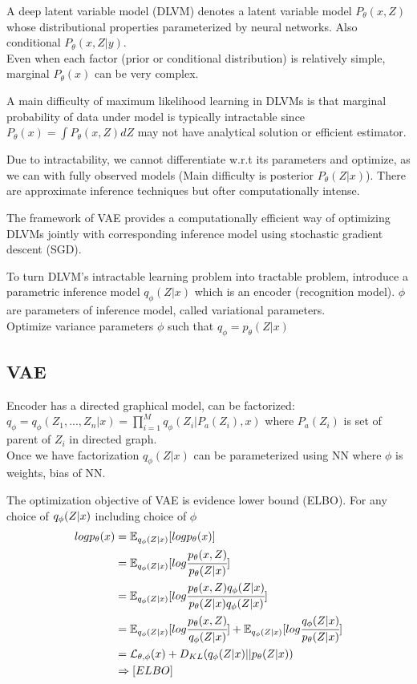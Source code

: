 \documentclass[12pt,a4paper]{article}
\begin{document}
A deep latent variable model (DLVM) denotes a latent variable model $P_\theta(x,Z)$ whose distributional properties parameterized by neural networks. Also conditional $P_\theta(x,Z|y)$. \\
Even when each factor (prior or conditional distribution) is relatively simple, marginal $P_\theta(x)$ can be very complex. 

A main difficulty of maximum likelihood learning in DLVMs is that marginal probability of data under model is typically intractable since $P_\theta(x)=\int P_\theta(x,Z)dZ$ may not have analytical solution or efficient estimator. 

Due to intractability, we cannot differentiate w.r.t its parameters and optimize, as we can with fully observed models (Main difficulty is posterior $P_\theta(Z|x)$). There are approximate inference techniques but ofter computationally intense. 

The framework of VAE provides a computationally efficient way of optimizing DLVMs jointly with corresponding inference model using stochastic gradient descent (SGD). 

To turn DLVM's intractable learning problem into tractable problem, introduce a parametric inference model $q_\phi(Z|x)$ which is an encoder (recognition model). $\phi$ are parameters of inference model, called variational parameters. \\
Optimize variance parameters $\phi$ such that $q_\phi=p_\theta(Z|x)$


\subsection{VAE}
Encoder has a directed graphical model, can be factorized:\\
$q_\phi=q_\phi(Z_1, ..., Z_n|x)=\prod^M_{i=1} q_\phi(Z_i|P_a(Z_i),x)$ where $P_a(Z_i)$ is set of parent of $Z_i$ in directed graph. \\
Once we have factorization $q_\phi(Z|x)$ can be parameterized using NN where $\phi$ is weights, bias of NN. 


\vspace{0.5cm}
The optimization objective of VAE is evidence lower bound (ELBO). For any choice of $q_\phi(Z|x)$ including choice of $\phi$\\

\begin{equation}
    \begin{split}
log p_\theta (x) &= \mathbb{E}_{q_\phi(Z|x)}[logp_\theta(x)] \\
&=\mathbb{E}_{q_\phi(Z|x)}[log\cfrac{p_\theta(x,Z)}{p_\theta(Z|x)}]\\
&=\mathbb{E}_{q_\phi(Z|x)}[log \cfrac{p_\theta(x,Z)q_\phi(Z|x)}{p_\theta(Z|x)q_\phi(Z|x)}] \\
&=\mathbb{E}_{q_\phi(Z|x)}[log\cfrac{p_\theta(x,Z)}{q_\phi(Z|x)}]+\mathbb{E}_{q_\phi(Z|x)}[log\cfrac{q_\phi(Z|x)}{p_\theta(Z|x)}]\\
&=\mathcal{L}_{\theta,\phi}(x)+D_{KL}(q_\phi(Z|x)||p_\theta(Z|x))\\
&\Rightarrow [ELBO]\\
\end{split}
\end{equation}
\end{document}
